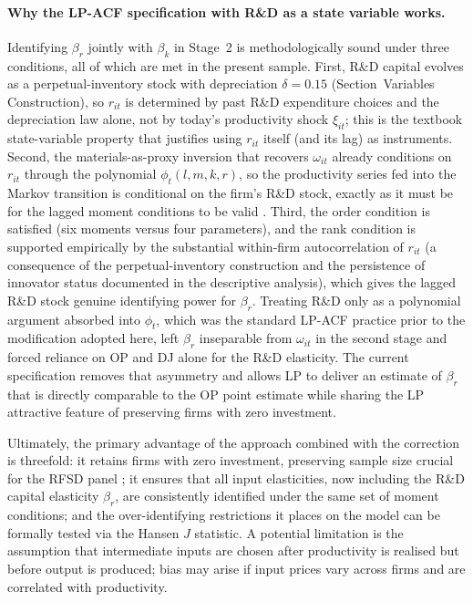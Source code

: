 \documentclass[a4paper, 12pt]{article}
\begin{document}
\paragraph{Why the LP-ACF specification with R\&D as a state variable works.} Identifying $\beta_r$ jointly with $\beta_k$ in Stage~2 is methodologically sound under three conditions, all of which are met in the present sample. First, R\&D capital evolves as a perpetual-inventory stock with depreciation $\delta = 0.15$ (Section~Variables Construction), so $r_{it}$ is determined by past R\&D expenditure choices and the depreciation law alone, not by today's productivity shock $\xi_{it}$; this is the textbook state-variable property that justifies using $r_{it}$ itself (and its lag) as instruments. Second, the materials-as-proxy inversion that recovers $\omega_{it}$ already conditions on $r_{it}$ through the polynomial $\phi_t(l, m, k, r)$, so the productivity series fed into the Markov transition is conditional on the firm's R\&D stock, exactly as it must be for the lagged moment conditions to be valid \parencite{ackerberg2015identification}. Third, the order condition is satisfied (six moments versus four parameters), and the rank condition is supported empirically by the substantial within-firm autocorrelation of $r_{it}$ (a consequence of the perpetual-inventory construction and the persistence of innovator status documented in the descriptive analysis), which gives the lagged R\&D stock genuine identifying power for $\beta_r$. Treating R\&D only as a polynomial argument absorbed into $\phi_t$, which was the standard LP-ACF practice prior to the modification adopted here, left $\beta_r$ inseparable from $\omega_{it}$ in the second stage and forced reliance on OP and DJ alone for the R\&D elasticity. The current specification removes that asymmetry and allows LP to deliver an estimate of $\beta_r$ that is directly comparable to the OP point estimate while sharing the LP attractive feature of preserving firms with zero investment.

Ultimately, the primary advantage of the \textcite{levinsohn2003estimating} approach combined with the \textcite{ackerberg2015identification} correction is threefold: it retains firms with zero investment, preserving sample size crucial for the RFSD panel \parencite{bondarkov2025russian}; it ensures that all input elasticities, now including the R\&D capital elasticity $\beta_r$, are consistently identified under the same set of moment conditions; and the over-identifying restrictions it places on the model can be formally tested via the Hansen $J$ statistic. A potential limitation is the assumption that intermediate inputs are chosen after productivity is realised but before output is produced; bias may arise if input prices vary across firms and are correlated with productivity.
\end{document}

